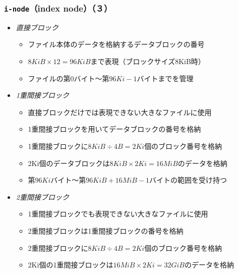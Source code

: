 \documentclass[unicode,handout]{beamer}                   %
\newcommand{\inode}{\texttt{i-node}}
\begin{document}
\begin{frame}
  \frametitle{\inode （index node）（３）}
  \begin{itemize}
  \item \emph{直接ブロック} \\
    \begin{itemize}
    \item ファイル本体のデータを格納するデータブロックの番号
    \item $8KiB \times 12 = 96KiB$まで表現（ブロックサイズ8KiB時）
    \item ファイルの第$0$バイト〜第$96Ki - 1$バイトまでを管理
    \end{itemize}
  \item \emph{1重間接ブロック}\\
    \begin{itemize}
    \item 直接ブロックだけでは表現できない大きなファイルに使用
    \item 1重間接ブロックを用いてデータブロックの番号を格納
    \item 1重間接ブロックに$8KiB \div 4B = 2Ki$個のブロック番号を格納
    \item 2Ki個のデータブロックは$8KiB \times 2Ki = 16MiB$のデータを格納
    \item 第$96Ki$バイト〜第$96KiB + 16MiB - 1$バイトの範囲を受け持つ
    \end{itemize}
  \item \emph{2重間接ブロック}\\
    \begin{itemize}
    \item 1重間接ブロックでも表現できない大きなファイルに使用
    \item 2重間接ブロックは1重間接ブロックの番号を格納
    \item 2重間接ブロックに$8KiB \div 4B = 2Ki$個のブロック番号を格納
    \item 2Ki個の1重間接ブロックは$16MiB \times 2Ki = 32GiB$のデータを格納
    \end{itemize}
  \end{itemize}
  \vfill
\end{frame}
\end{document}
